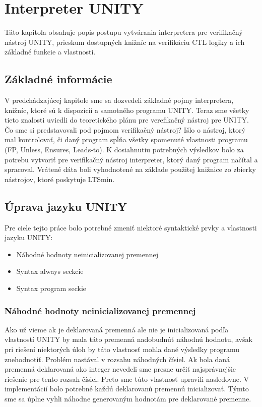 \chapter{Interpreter UNITY}\label{chap:unity}

Táto kapitola obsahuje popis postupu vytvárania interpretera pre verifikačný nástroj UNITY, prieskum 
dostupných knižníc na verifikáciu CTL logiky a ich základné funkcie a vlastnosti.

\section{Základné informácie}
V predchádzajúcej kapitole sme sa dozvedeli základné pojmy interpretera, knižníc, ktoré sú k dispozícií a samotného 
programu UNITY. Teraz sme všetky tieto znalosti uviedli do teoretického plánu pre verefikačný 
nástroj pre UNITY. Čo sme si predstavovali pod pojmom verifikačný nástroj? Išlo o nástroj, ktorý mal kontrolovať, či daný
program spĺňa všetky spomenuté vlastnosti programu (FP, Unless, Ensures, Leads-to). K dosiahnutiu potrebných výsledkov bolo za potrebu 
vytvoriť pre verifikačný nástroj interpreter, ktorý daný program načítal a spracoval. Vrátené dáta boli 
vyhodnotené na základe použitej knižnice zo zbierky nástrojov, ktoré poskytuje LTSmin. 

\section{Úprava jazyku UNITY}
Pre ciele tejto práce bolo potrebné zmeniť niektoré syntaktické prvky a vlastnosti jazyku UNITY:

\begin{itemize}
    \item Náhodné hodnoty neinicializovanej premennej
    \item Syntax always seckcie
    \item Syntax program seckie
\end{itemize}

\subsection{Náhodné hodnoty neinicializovanej premennej}
Ako už vieme ak je deklarovaná premenná ale nie je inicializovaná podľa vlastností UNITY by mala táto 
premenná nadobudnúť náhodnú hodnotu, avšak pri riešení niektorých úloh by táto vlastnosť mohla dané 
výsledky programu znehodnotiť. Problém nastával v rozsahu náhodných čísiel. Ak bola daná premenná 
deklarovaná ako integer nevedeli sme presne určiť najsprávnejšie riešenie pre tento rozsah čísiel. Preto 
sme túto vlastnosť upravili nasledovne. V implementácií bolo potrebné každú deklarovanú premennú inicializovať. 
Týmto sme sa úplne vyhli náhodne generovaným hodnotám pre deklarované premenne.

